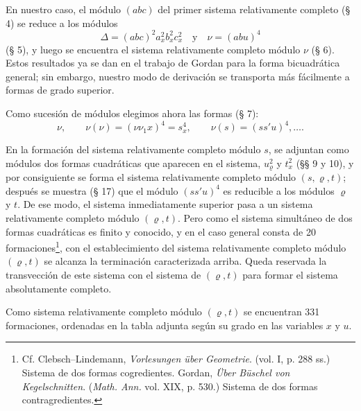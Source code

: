 \documentclass[11pt]{article}
\begin{document}
En nuestro caso, el módulo $(abc)$ del primer sistema relativamente completo (§ 4) se reduce a los módulos
\[
\Delta=(abc)^2a_x^2b_x^2c_x^2\quad\text{y}\quad \nu=(abu)^4
\]
(§ 5), y luego se encuentra el sistema relativamente completo módulo $\nu$ (§ 6). Estos resultados ya se dan en el trabajo de Gordan para la forma bicuadrática general; sin embargo, nuestro modo de derivación se transporta más fácilmente a formas de grado superior.

Como sucesión de módulos elegimos ahora las formas (§ 7):
\[
\nu,\qquad \nu(\nu)=(\nu\nu_1x)^4=s_x^4,\qquad \nu(s)=(ss'u)^4,\ldots .
\]

En la formación del sistema relativamente completo módulo $s$, se adjuntan como módulos dos formas cuadráticas que aparecen en el sistema, $u_\varrho^2$ y $t_x^2$ (§§ 9 y 10), y por consiguiente se forma el sistema relativamente completo módulo $(s,\varrho,t)$; después se muestra (§ 17) que el módulo $(ss'u)^4$ es reducible a los módulos $\varrho$ y $t$. De ese modo, el sistema inmediatamente superior pasa a un sistema relativamente completo módulo $(\varrho,t)$. Pero como el sistema simultáneo de dos formas cuadráticas es finito y conocido, y en el caso general consta de 20 formaciones\footnote{Cf. Clebsch--Lindemann, \emph{Vorlesungen über Geometrie}. (vol. I, p. 288 ss.) Sistema de dos formas cogredientes. Gordan, \emph{Über Büschel von Kegelschnitten}. (\emph{Math. Ann.} vol. XIX, p. 530.) Sistema de dos formas contragredientes.}, con el establecimiento del sistema relativamente completo módulo $(\varrho,t)$ se alcanza la terminación caracterizada arriba. Queda reservada la transvección de este sistema con el sistema de $(\varrho,t)$ para formar el sistema absolutamente completo.

Como sistema relativamente completo módulo $(\varrho,t)$ se encuentran 331 formaciones, ordenadas en la tabla adjunta según su grado en las variables $x$ y $u$.
\end{document}

